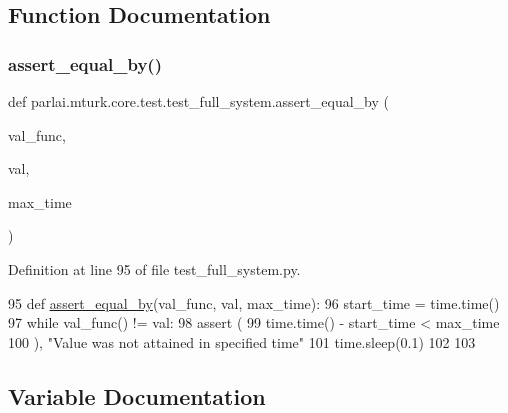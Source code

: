 \subsection{Function Documentation}
\mbox{\label{namespaceparlai_1_1mturk_1_1core_1_1test_1_1test__full__system_a0b463246d35658a2e422010f13dcf819}} 
\subsubsection{\texorpdfstring{assert\+\_\+equal\+\_\+by()}{assert\_equal\_by()}}
{\footnotesize\ttfamily def parlai.\+mturk.\+core.\+test.\+test\+\_\+full\+\_\+system.\+assert\+\_\+equal\+\_\+by (\begin{DoxyParamCaption}\item[{}]{val\+\_\+func,  }\item[{}]{val,  }\item[{}]{max\+\_\+time }\end{DoxyParamCaption})}



Definition at line 95 of file test\+\_\+full\+\_\+system.\+py.


\begin{DoxyCode}
95 \textcolor{keyword}{def }\hyperlink{namespaceparlai_1_1mturk_1_1core_1_1test_1_1test__full__system_a0b463246d35658a2e422010f13dcf819}{assert\_equal\_by}(val\_func, val, max\_time):
96     start\_time = time.time()
97     \textcolor{keywordflow}{while} val\_func() != val:
98         \textcolor{keyword}{assert} (
99             time.time() - start\_time < max\_time
100         ), \textcolor{stringliteral}{"Value was not attained in specified time"}
101         time.sleep(0.1)
102 
103 
\end{DoxyCode}


\subsection{Variable Documentation}
\mbox{\label{namespaceparlai_1_1mturk_1_1core_1_1test_1_1test__full__system_a27d685a0b640f60b477faa936c4857bd}} 

